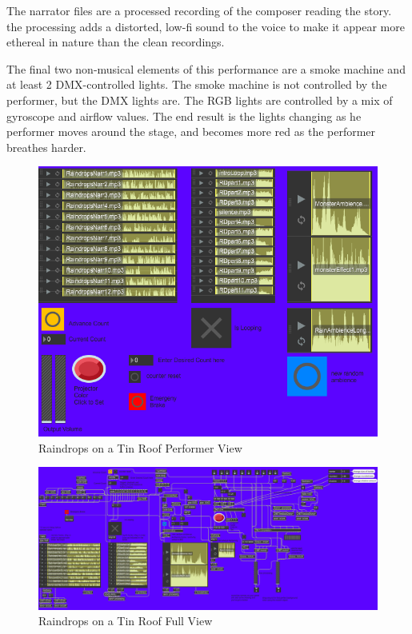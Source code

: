 The narrator files are a processed recording of the composer reading the story. the processing adds a distorted, low-fi sound to the voice to make it appear more ethereal in nature than the clean recordings. 

The final two non-musical elements of this performance are a smoke machine and at least 2 DMX-controlled lights. The smoke machine is not controlled by the performer, but the DMX lights are. The RGB lights are controlled by a mix of gyroscope and airflow values. The end result is the lights changing as he performer moves around the stage, and becomes more red as the performer breathes harder.

\begin{figure}
    \centering
    \includegraphics{diagrams/maxPatches/raindropspres.png}
    \caption{Raindrops on a Tin Roof Performer View}
    \label{fig:raindropsPres}
\end{figure}

\begin{figure}
    \centering
    \includegraphics[scale=0.6]{diagrams/maxPatches/raindropsRaw.png}
    \caption{Raindrops on a Tin Roof Full View}
    \label{fig:raindropsRaw}
\end{figure}

